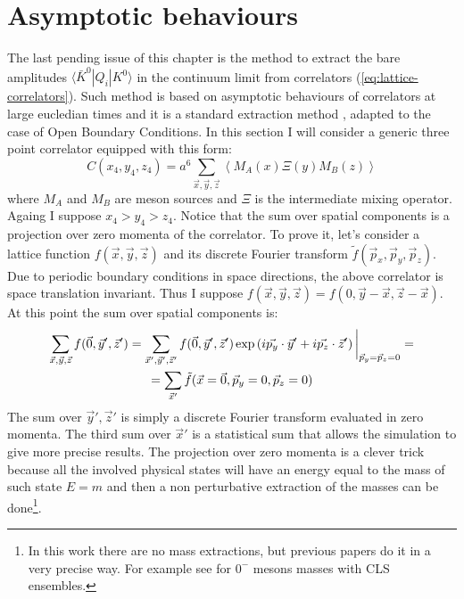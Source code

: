 \documentclass[english, LaM, oneside, noexaminfo]{sapthesis}
\newcommand{\la}{\langle}
\newcommand{\ra}{\rangle}
\newcommand{\obc}{Open Boundary Conditions}
\begin{document}
\section{Asymptotic behaviours}\label{sec:asympt-behav}
\noindent
The last pending issue of this chapter is the method to extract the bare amplitudes $\la \bar K^0 | Q_i | K^0 \ra$ in the continuum limit from correlators (\ref{eq:lattice-correlators}).
Such method is based on asymptotic behaviours of correlators at large eucledian times and it is a standard extraction method \cite{montvay-munster}, adapted to the case of \obc\space \cite{ExtractionSpectralQuantities}.
In this section I will consider a generic three point correlator equipped with this form:
\begin{equation}\label{eq:correlator-prototype}
    C(x_4,y_4,z_4) = a^6\sum_{\vec x, \vec y, \vec z} \left\la M_A (x) \Xi (y) M_B (z) \right\ra
\end{equation}
where $M_{A}$ and $M_{B}$ are meson sources and $\Xi$ is the intermediate mixing operator.
Againg I suppose $x_4 > y_4 > z_4$.
Notice that the sum over spatial components is a projection over zero momenta of the correlator.
To prove it, let's consider a lattice function $f(\vec x,\vec y,\vec z)$ and its discrete Fourier transform $\tilde{f}(\vec p_x,\vec p_y,\vec p_z)$.
Due to periodic boundary conditions in space directions, the above correlator is space translation invariant.
Thus I suppose $f(\vec x, \vec y, \vec z) = f(0, \vec y - \vec x, \vec z - \vec x)$.
At this point the sum over spatial components is:
\begin{equation*}
    \begin{gathered}
        \sum_{\vec x, \vec y, \vec z} f(\vec 0,\vec y',\vec z') = \sum_{\vec x', \vec y', \vec z'} f(\vec 0,\vec y',\vec z') \hspace*{.5mm} \text{exp}\left(i\vec{p_y}\cdot\vec{y}'+i\vec{p_z}\cdot\vec{z}' \right)\bigg|_{\vec p_y = \vec p_z = 0} = \\
        = \sum_{\vec x'} \tilde{f}(\vec x = \vec 0, \vec p_y = 0, \vec p_z = 0)
    \end{gathered}
\end{equation*}
The sum over $\vec y', \vec z'$ is simply a discrete Fourier transform evaluated in zero momenta. The third sum over $\vec x'$ is a statistical sum that allows the simulation to give more precise results.
The projection over zero momenta is a clever trick because all the involved physical states will have an energy equal to the mass of such state $E=m$ and then a non perturbative extraction of the masses can be done\footnote{In this work there are no mass extractions, but previous papers do it in a very precise way. For example see \cite{LightMesons}\cite{OBC-tm} for $0^{-}$ mesons masses with CLS ensembles.}.
\end{document}
